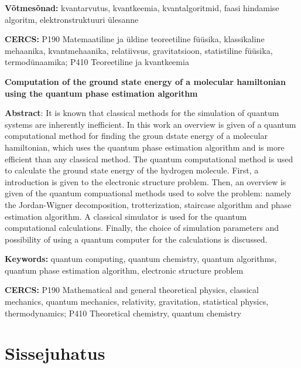 \documentclass[12pt]{report}
\begin{document}
\vspace*{1ex}

\noindent\textbf{Võtmesõnad:}
kvantarvutus, kvantkeemia, kvantalgoritmid, faasi hindamise algoritm, elektronstruktuuri ülesanne

\vspace*{1ex}

\noindent\textbf{CERCS:}
P190 Matemaatiline ja üldine teoreetiline füüsika, klassikaline mehaanika, kvantmehaanika, relatiivsus, gravitatsioon, statistiline füüsika, termodünaamika;
P410 Teoreetiline ja kvantkeemia

\vspace*{2ex}

\noindent\textbf{\large Computation of the ground state energy of a molecular hamiltonian using the quantum phase estimation algorithm}

\vspace*{1ex}

\noindent\textbf{Abstract}:
It is known that classical methods for the simulation of quantum systems are inherently inefficient.
In this work an overview is given of a quantum computational method for finding the groun dstate energy of a molecular hamiltonian, which uses the quantum phase estimation algorithm and is more efficient than any classical method.
The quantum computational method is used to calculate the ground state energy of the hydrogen molecule.
First, a introduction is given to the electronic structure problem.
Then, an overview is given of the quantum compuational methods used to solve the problem: namely the Jordan-Wigner decomposition, trotterization, staircase algorithm and phase estimation algorithm.
A classical simulator is used for the quantum computational calculations.
Finally, the choice of simulation parameters and possibility of using a quantum computer for the calculations is discussed.

\noindent\textbf{Keywords:}
quantum computing, quantum chemistry, quantum algorithms, quantum phase estimation algorithm, electronic structure problem

\vspace*{1ex}

\noindent\textbf{CERCS:}
P190 Mathematical and general theoretical physics, classical mechanics, quantum
mechanics, relativity, gravitation, statistical physics, thermodynamics; P410 Theoretical chemistry, quantum chemistry

\tableofcontents

\chapter{Sissejuhatus}
\end{document}
